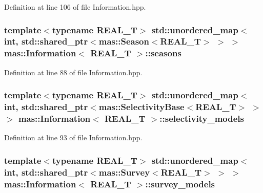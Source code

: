 Definition at line 106 of file Information.\-hpp.

\hypertarget{classmas_1_1_information_a65c0643d2ab88f4e23004aaf9565b359}{
\subsubsection[{seasons}]{\setlength{\rightskip}{0pt plus 5cm}template$<$typename R\-E\-A\-L\-\_\-\-T$>$ std\-::unordered\-\_\-map$<$int, std\-::shared\-\_\-ptr$<${\bf mas\-::\-Season}$<$R\-E\-A\-L\-\_\-\-T$>$ $>$ $>$ {\bf mas\-::\-Information}$<$ R\-E\-A\-L\-\_\-\-T $>$\-::seasons}}\label{classmas_1_1_information_a65c0643d2ab88f4e23004aaf9565b359}


Definition at line 88 of file Information.\-hpp.

\hypertarget{classmas_1_1_information_ae771fa7c04d112e57d58ade01645d298}{
\subsubsection[{selectivity\-\_\-models}]{\setlength{\rightskip}{0pt plus 5cm}template$<$typename R\-E\-A\-L\-\_\-\-T$>$ std\-::unordered\-\_\-map$<$int, std\-::shared\-\_\-ptr$<${\bf mas\-::\-Selectivity\-Base}$<$R\-E\-A\-L\-\_\-\-T$>$ $>$ $>$ {\bf mas\-::\-Information}$<$ R\-E\-A\-L\-\_\-\-T $>$\-::selectivity\-\_\-models}}\label{classmas_1_1_information_ae771fa7c04d112e57d58ade01645d298}


Definition at line 93 of file Information.\-hpp.

\hypertarget{classmas_1_1_information_ad9eb1c49a6565f76e0605afdb39fa8fa}{
\subsubsection[{survey\-\_\-models}]{\setlength{\rightskip}{0pt plus 5cm}template$<$typename R\-E\-A\-L\-\_\-\-T$>$ std\-::unordered\-\_\-map$<$int, std\-::shared\-\_\-ptr$<${\bf mas\-::\-Survey}$<$R\-E\-A\-L\-\_\-\-T$>$ $>$ $>$ {\bf mas\-::\-Information}$<$ R\-E\-A\-L\-\_\-\-T $>$\-::survey\-\_\-models}}\label{classmas_1_1_information_ad9eb1c49a6565f76e0605afdb39fa8fa}


